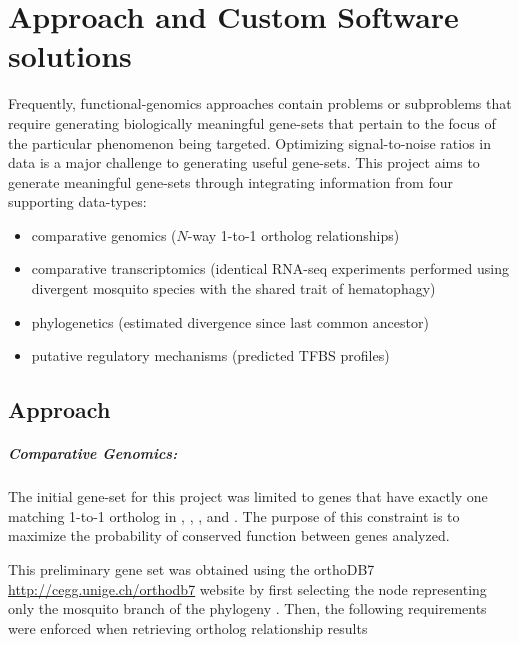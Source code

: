 
\chapter{Approach and Custom Software solutions} \label{chap:3}


Frequently, \gls{functional-genomics} approaches contain problems or subproblems that require generating biologically meaningful gene-sets that pertain to the focus of the particular phenomenon being targeted.
Optimizing signal-to-noise ratios in data is a major challenge to generating useful gene-sets.
This project aims to generate meaningful gene-sets through integrating information from four supporting data-types:

\begin{itemize}
    \item comparative genomics ($N$-way 1-to-1 ortholog relationships)
    \item comparative transcriptomics (identical RNA-seq experiments performed using divergent mosquito species with the shared trait of \gls{hematophagy})
    \item phylogenetics (estimated divergence since last common ancestor)
    \item putative regulatory mechanisms (predicted \gls{TFBS} profiles)
\end{itemize}



\section{Approach}

\paragraph*{Comparative Genomics:}

The initial gene-set for this project was limited to genes that have exactly one matching 1-to-1 ortholog in \Aa, \Ag, \As, and \Cq.
The purpose of this constraint is to maximize the probability of conserved function between genes analyzed. 

This preliminary gene set was obtained using the orthoDB7 \url{http://cegg.unige.ch/orthodb7} website by first selecting the node representing only the mosquito branch of the phylogeny \cite{Waterhouse2013}.
Then, the following requirements were enforced when retrieving ortholog relationship results 

